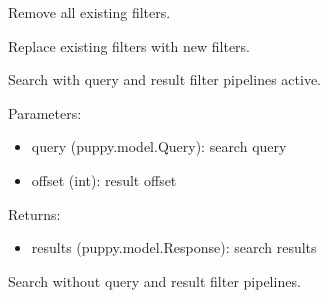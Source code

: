 \documentclass[letterpaper,10pt,english]{sphinxmanual}
\begin{document}
\begin{fulllineitems}
\begin{fulllineitems}
\end{fulllineitems}


\begin{fulllineitems}
\label{api3.0:puppy.service.SearchService.clear_filters}
Remove all existing filters.

\end{fulllineitems}


\begin{fulllineitems}
\label{api3.0:puppy.service.SearchService.replace_filters}
Replace existing filters with new filters.

\end{fulllineitems}


\begin{fulllineitems}
\label{api3.0:puppy.service.SearchService.search}
Search with query and result filter pipelines active.

Parameters:
\begin{itemize}
\item {} 
query (puppy.model.Query): search query

\item {} 
offset (int): result offset

\end{itemize}

Returns:
\begin{itemize}
\item {} 
results (puppy.model.Response): search results

\end{itemize}

\end{fulllineitems}


\begin{fulllineitems}
\label{api3.0:puppy.service.SearchService.simplesearch}
Search without query and result filter pipelines.


\end{fulllineitems}
\end{fulllineitems}
\end{document}
